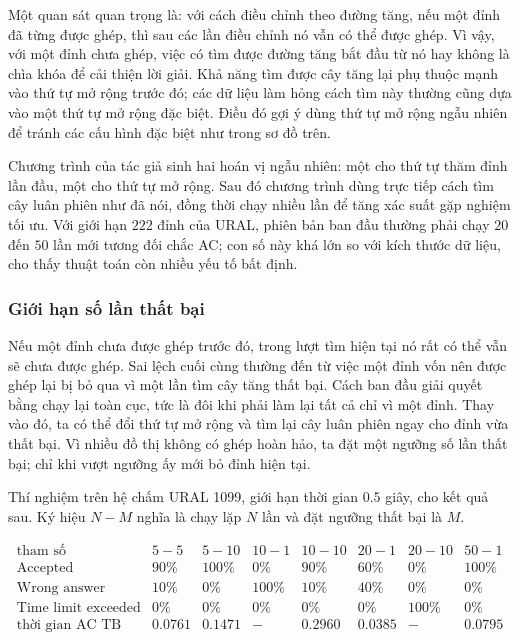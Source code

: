 \documentclass[11pt]{article}
\begin{document}
Một quan sát quan trọng là: với cách điều chỉnh theo đường tăng, nếu một đỉnh
đã từng được ghép, thì sau các lần điều chỉnh nó vẫn có thể được ghép. Vì
vậy, với một đỉnh chưa ghép, việc có tìm được đường tăng bắt đầu từ nó hay
không là chìa khóa để cải thiện lời giải. Khả năng tìm được cây tăng lại phụ
thuộc mạnh vào thứ tự mở rộng trước đó; các dữ liệu làm hỏng cách tìm này
thường cũng dựa vào một thứ tự mở rộng đặc biệt. Điều đó gợi ý dùng thứ tự
mở rộng ngẫu nhiên để tránh các cấu hình đặc biệt như trong sơ đồ trên.

Chương trình của tác giả sinh hai hoán vị ngẫu nhiên: một cho thứ tự thăm
đỉnh lần đầu, một cho thứ tự mở rộng. Sau đó chương trình dùng trực tiếp
cách tìm cây luân phiên như đã nói, đồng thời chạy nhiều lần để tăng xác
suất gặp nghiệm tối ưu. Với giới hạn \(222\) đỉnh của URAL, phiên bản ban
đầu thường phải chạy \(20\) đến \(50\) lần mới tương đối chắc AC; con số này
khá lớn so với kích thước dữ liệu, cho thấy thuật toán còn nhiều yếu tố bất
định.

\subsubsection{Giới hạn số lần thất bại}

Nếu một đỉnh chưa được ghép trước đó, trong lượt tìm hiện tại nó rất có thể
vẫn sẽ chưa được ghép. Sai lệch cuối cùng thường đến từ việc một đỉnh vốn nên
được ghép lại bị bỏ qua vì một lần tìm cây tăng thất bại. Cách ban đầu giải
quyết bằng chạy lại toàn cục, tức là đôi khi phải làm lại tất cả chỉ vì một
đỉnh. Thay vào đó, ta có thể đổi thứ tự mở rộng và tìm lại cây luân phiên
ngay cho đỉnh vừa thất bại. Vì nhiều đồ thị không có ghép hoàn hảo, ta đặt
một ngưỡng số lần thất bại; chỉ khi vượt ngưỡng ấy mới bỏ đỉnh hiện tại.

Thí nghiệm trên hệ chấm URAL 1099, giới hạn thời gian \(0.5\) giây, cho kết
quả sau. Ký hiệu \(N-M\) nghĩa là chạy lặp \(N\) lần và đặt ngưỡng thất bại
là \(M\).

\[
\begin{array}{c|rrrrrrr}
\text{tham số} & 5\!-\!5 & 5\!-\!10 & 10\!-\!1 & 10\!-\!10 & 20\!-\!1 & 20\!-\!10 & 50\!-\!1 \\
\hline
\text{Accepted} & 90\% & 100\% & 0\% & 90\% & 60\% & 0\% & 100\% \\
\text{Wrong answer} & 10\% & 0\% & 100\% & 10\% & 40\% & 0\% & 0\% \\
\text{Time limit exceeded} & 0\% & 0\% & 0\% & 0\% & 0\% & 100\% & 0\% \\
\text{thời gian AC TB} & 0.0761 & 0.1471 & {-} & 0.2960 & 0.0385 & {-} & 0.0795
\end{array}
\]
\end{document}
